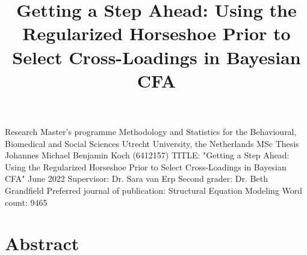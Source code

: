 \documentclass[
  man, donotrepeattitle,floatsintext]{apa6}
\title{Getting a Step Ahead: Using the Regularized Horseshoe Prior to Select Cross-Loadings in Bayesian CFA}
\author{\phantom{0}}
\date{}
\affiliation{\phantom{0}}
\begin{document}
\maketitle

\thispagestyle{empty}

\begin{large}
\noindent Research Master's programme 
Methodology and Statistics for the Behavioural, Biomedical and Social Sciences \newline
Utrecht University, the Netherlands \newline
\newline
\newline
\newline
\newline
MSc Thesis Johannes Michael Benjamin Koch (6412157) 
\newline
TITLE: "Getting a Step Ahead: Using the Regularized Horseshoe Prior to Select Cross-Loadings in Bayesian CFA"
\newline
June 2022 
\newline
\newline
\newline
\newline
\newline
Supervisor:\newline
Dr. Sara van Erp \newline
\newline
\newline
Second grader: \newline
Dr. Beth Grandfield
\newline
\newline
\newline
\newline
Preferred journal of publication: Structural Equation Modeling
\newline
Word count: 9465
\newline
\end{large}
\addtocounter{page}{-1}
\clearpage
\pagebreak

\pagestyle{plain}

\clearpage

\hypertarget{abstract}{%
\section{Abstract}\label{abstract}}
\end{document}
